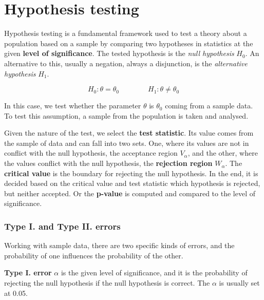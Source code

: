 


\section{Hypothesis testing}

Hypothesis testing is a fundamental framework used to test a theory about a population based on a sample by comparing two hypotheses in statistics at the given \textbf{level of significance}. The tested hypothesis is the \textit{null hypothesis} $H_0$. An alternative to this, usually a negation, always a disjunction, is the \textit{alternative hypothesis} $H_1$. 

\begin{equation}
    H_0: \theta = \theta_0 \qquad \qquad H_1:  \theta \ne \theta_0
\end{equation}

In this case, we test whether the parameter $\theta$ is $\theta_0$ coming from a sample data. To test this assumption, a sample from the population is taken and analysed.  

Given the nature of the test, we select the \textbf{test statistic}. Its value comes from the sample of data and can fall into two sets. One, where its values are not in conflict with the null hypothesis, the acceptance region $V_\alpha$, and the other, where the values conflict with the null hypothesis, the \textbf{rejection region} $W_\alpha$. The \textbf{critical value} is the boundary for rejecting the null hypothesis. In the end, it is decided based on the critical value and test statistic which hypothesis is rejected, but neither accepted. Or the \textbf{p-value} is computed and compared to the level of significance. \cite{Mala2024, Marek2024}

\subsubsection*{Type I. and Type II. errors}

Working with sample data, there are two specific kinds of errors, and the probability of one influences the probability of the other. 

\textbf{Type I. error} $\alpha$ is the given level of significance, and it is the probability of rejecting the null hypothesis if the null hypothesis is correct. The $\alpha$ is usually set at 0.05. 

